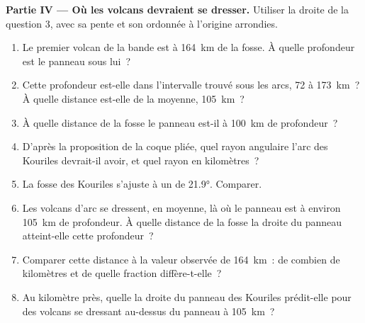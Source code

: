 \begin{problem}
\medskip
\noindent\textbf{Partie IV --- Où les volcans devraient se dresser.} Utiliser la droite
de la question 3, avec sa pente et son ordonnée à l'origine arrondies.
\begin{enumerate}[resume]
  \item Le premier volcan de la bande est à \qty{164}{km} de la fosse. À quelle profondeur
        est le panneau sous lui~?
  \item Cette profondeur est-elle dans l'intervalle trouvé sous les arcs, 72 à
        \qty{173}{km}~? À quelle distance est-elle de la moyenne, \qty{105}{km}~?
  \item À quelle distance de la fosse le panneau est-il à \qty{100}{km} de profondeur~?
  \item D'après la proposition de la coque pliée, quel rayon angulaire l'arc des
        Kouriles devrait-il avoir, et quel rayon en kilomètres~?
  \item La fosse des Kouriles s'ajuste à un  de \ang{21.9}. Comparer.
  \item Les volcans d'arc se dressent, en moyenne, là où le panneau est à environ
        \qty{105}{km} de profondeur. À quelle distance de la fosse la droite du panneau
        atteint-elle cette profondeur~?
  \item Comparer cette distance à la valeur observée de \qty{164}{km}~: de combien de
        kilomètres et de quelle fraction diffère-t-elle~?
  \item Au kilomètre près, quelle  la droite du panneau des Kouriles
        prédit-elle pour des volcans se dressant au-dessus du panneau à \qty{105}{km}~?
\end{enumerate}
\end{problem}
